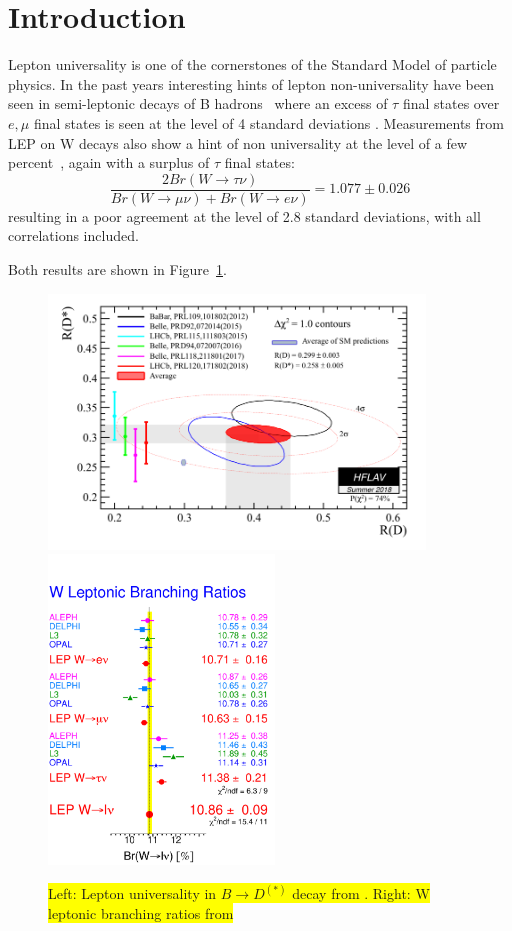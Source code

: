 \section{Introduction}
\label{sec:intro}

Lepton universality is one of the cornerstones of the Standard Model of particle physics. 
In the past years interesting hints of lepton non-universality have been seen in semi-leptonic decays of B hadrons~\cite{HFLAV16} where an excess of $\tau$ final states over $e,\mu$ final states is seen at the level of 4 standard deviations .
Measurements from LEP on W decays also show a hint of non universality at the level of a few percent~\cite{LEP-2}, again with a surplus of $\tau$ final states: 
\begin{equation}
  \label{eq:LEP_BRoverBRAll}
  \frac{2Br(W\to\tau\nu)}{Br(W\to\mu\nu)+Br(W\to e\nu)} = 1.077 \pm 0.026
\end{equation}
resulting in a poor agreement at the level of 2.8 standard deviations, with all correlations included.

Both results are shown in Figure~\ref{fig:lnuhints}.

\begin{figure}[htbp]
\centering
\includegraphics[width=10cm]{figures/rdrds_summer18.png}
\includegraphics[width=6cm]{figures/4f_brlv_lep_2008.pdf}
\caption{\colorbox{yellow}{Left: Lepton universality in $B\to D^{(*)}$ decay from \cite{HFLAV16}. 
Right:  W leptonic branching ratios from \cite{LEP-2}}}
\label{fig:lnuhints}
\end{figure}

